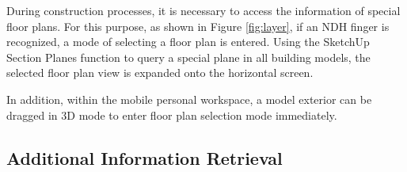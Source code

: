 During construction processes, it is necessary to access the information of special floor plans. For this purpose, as shown in Figure \ref{fig:layer}, if an NDH finger is recognized, a mode of selecting a floor plan is entered. Using the SketchUp Section Planes function to query a special plane in all building models, the selected floor plan view is expanded onto the horizontal screen.

In addition, within the mobile personal workspace, a model exterior can be dragged in 3D mode to enter floor plan selection mode immediately.




\subsection{Additional Information Retrieval}



